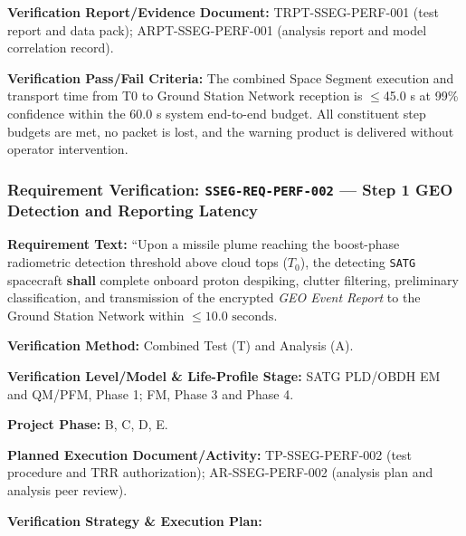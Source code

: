 \par\textbf{Verification Report/Evidence Document:} TRPT-SSEG-PERF-001 (test report and data pack); ARPT-SSEG-PERF-001 (analysis report and model correlation record).
\par\textbf{Verification Pass/Fail Criteria:} The combined Space Segment execution and transport time from T0 to Ground Station Network reception is $\le$45.0 s at 99\% confidence within the 60.0 s system end-to-end budget. All constituent step budgets are met, no packet is lost, and the warning product is delivered without operator intervention.
\par\medskip
\subsubsection{Requirement Verification: \texttt{SSEG-REQ-PERF-002} --- Step 1 GEO Detection and Reporting Latency}
\label{ver:SSEG-REQ-PERF-002}
\textbf{Requirement Text:} ``Upon a missile plume reaching the boost-phase radiometric detection threshold above cloud tops ($T_0$), the detecting \texttt{SATG} spacecraft \textbf{shall} complete onboard proton despiking, clutter filtering, preliminary classification, and transmission of the encrypted \emph{GEO Event Report} to the Ground Station Network within $\le 10.0\text{ seconds}$.
\par\textbf{Verification Method:} Combined Test (T) and Analysis (A).
\par\textbf{Verification Level/Model \& Life-Profile Stage:} SATG PLD/OBDH EM and QM/PFM, Phase 1; FM, Phase 3 and Phase 4.
\par\textbf{Project Phase:} B, C, D, E.
\par\textbf{Planned Execution Document/Activity:} TP-SSEG-PERF-002 (test procedure and TRR authorization); AR-SSEG-PERF-002 (analysis plan and analysis peer review).
\par\textbf{Verification Strategy \& Execution Plan:}

